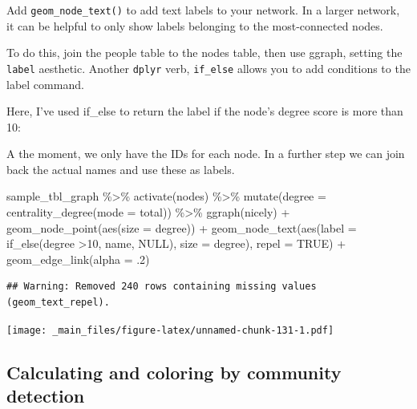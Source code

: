 \documentclass[
]{book}
\newenvironment{Shaded}{\begin{snugshade}}{\end{snugshade}}
\newcommand{\AttributeTok}[1]{\textcolor[rgb]{0.77,0.63,0.00}{#1}}
\newcommand{\ConstantTok}[1]{\textcolor[rgb]{0.00,0.00,0.00}{#1}}
\newcommand{\DecValTok}[1]{\textcolor[rgb]{0.00,0.00,0.81}{#1}}
\newcommand{\FunctionTok}[1]{\textcolor[rgb]{0.00,0.00,0.00}{#1}}
\newcommand{\NormalTok}[1]{#1}
\newcommand{\SpecialCharTok}[1]{\textcolor[rgb]{0.00,0.00,0.00}{#1}}
\newcommand{\StringTok}[1]{\textcolor[rgb]{0.31,0.60,0.02}{#1}}
\begin{document}
Add \texttt{geom\_node\_text()} to add text labels to your network. In a larger network, it can be helpful to only show labels belonging to the most-connected nodes.

To do this, join the people table to the nodes table, then use ggraph, setting the \texttt{label} aesthetic. Another \texttt{dplyr} verb, \texttt{if\_else} allows you to add conditions to the label command.

Here, I've used if\_else to return the label if the node's degree score is more than 10:

A the moment, we only have the IDs for each node. In a further step we can join back the actual names and use these as labels.

\begin{Shaded}
\begin{Highlighting}[]
\NormalTok{sample\_tbl\_graph }\SpecialCharTok{\%\textgreater{}\%} 
  \FunctionTok{activate}\NormalTok{(nodes) }\SpecialCharTok{\%\textgreater{}\%} 
  \FunctionTok{mutate}\NormalTok{(}\AttributeTok{degree =} \FunctionTok{centrality\_degree}\NormalTok{(}\AttributeTok{mode =} \StringTok{\textquotesingle{}total\textquotesingle{}}\NormalTok{))  }\SpecialCharTok{\%\textgreater{}\%} 
  \FunctionTok{ggraph}\NormalTok{(}\StringTok{\textquotesingle{}nicely\textquotesingle{}}\NormalTok{) }\SpecialCharTok{+} 
  \FunctionTok{geom\_node\_point}\NormalTok{(}\FunctionTok{aes}\NormalTok{(}\AttributeTok{size =}\NormalTok{ degree)) }\SpecialCharTok{+} 
  \FunctionTok{geom\_node\_text}\NormalTok{(}\FunctionTok{aes}\NormalTok{(}\AttributeTok{label =} \FunctionTok{if\_else}\NormalTok{(degree }\SpecialCharTok{\textgreater{}}\DecValTok{10}\NormalTok{, name, }\ConstantTok{NULL}\NormalTok{), }\AttributeTok{size =}\NormalTok{ degree), }\AttributeTok{repel =} \ConstantTok{TRUE}\NormalTok{) }\SpecialCharTok{+} 
  \FunctionTok{geom\_edge\_link}\NormalTok{(}\AttributeTok{alpha =}\NormalTok{ .}\DecValTok{2}\NormalTok{)}
\end{Highlighting}
\end{Shaded}

\begin{verbatim}
## Warning: Removed 240 rows containing missing values (geom_text_repel).
\end{verbatim}

\texttt{[image: \_main\_files/figure-latex/unnamed-chunk-131-1.pdf]}

\hypertarget{calculating-and-coloring-by-community-detection}{%
\subsection{Calculating and coloring by community detection}\label{calculating-and-coloring-by-community-detection}}
\end{document}
